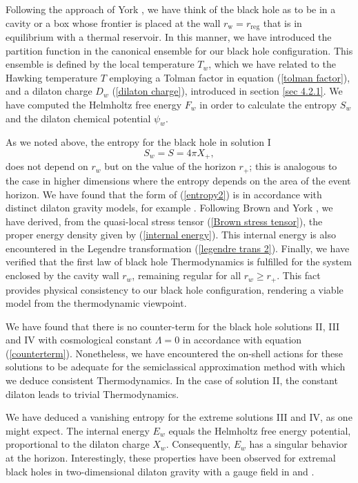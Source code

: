 \documentclass[sn-mathphys,Numbered]{sn-jnl}%
\theoremstyle{thmstyleone}%
\theoremstyle{thmstyletwo}%
\theoremstyle{thmstylethree}%
\begin{document}
Following the approach of York \cite{York2}, we have think of the black hole as to be in a cavity or a box whose frontier is placed at the wall $r_{\text{w}}=r_{\text{reg}}$ that is in equilibrium with a thermal reservoir. In this manner, we have introduced the partition function in the canonical ensemble for our black hole configuration. This ensemble is defined by the local temperature $T_w$, which we have related to the Hawking temperature $T$ employing a Tolman factor in equation (\ref{tolman factor}), and a dilaton charge $D_w$ (\ref{dilaton charge}), introduced in section \ref{sec 4.2.1}. We have computed the Helmholtz free energy $F_w$ in order to calculate the entropy $S_w$ and the dilaton chemical potential $\psi_w$. 

As we noted above, the entropy for the black hole in solution I
%
\begin{equation}\label{entropy2}
    S_w= S= 4\pi X_+,
\end{equation}
%
does not depend on $r_w$ but on the value of the horizon $r_+$; this is analogous to the case in higher dimensions where the entropy depends on the area of the event horizon. We have found that the form of (\ref{entropy2}) is in accordance with distinct dilaton gravity models, for example \cite{Grumiller,Davis,Nappi}. Following Brown and York \cite{Brown}, we have derived, from the quasi-local stress tensor (\ref{Brown stress tensor}), the proper energy density given by (\ref{internal energy}). This internal energy is also encountered in the Legendre transformation (\ref{legendre trans 2}). Finally, we have verified that the first law of black hole Thermodynamics is fulfilled for the system enclosed by the cavity wall $r_w$, remaining regular for all $r_w\geq r_+$. This fact provides physical consistency to our black hole configuration, rendering a viable model from the thermodynamic viewpoint. 

We have found that there is no counter-term for the black hole solutions II, III and IV with cosmological constant $\Lambda=0$ in accordance with equation (\ref{counterterm}). Nonetheless, we have encountered the on-shell actions for these solutions to be adequate for the semiclassical approximation method with which we deduce consistent Thermodynamics. In the case of solution II, the constant dilaton leads to trivial Thermodynamics.

We have deduced a vanishing entropy for the extreme solutions III and IV, as one might expect. The internal energy $E_w$ equals the Helmholtz free energy potential, proportional to the dilaton charge $X_w$. Consequently, $E_w$ has a singular behavior at the horizon. Interestingly, these properties have been observed for extremal black holes in two-dimensional dilaton gravity with a gauge field in \cite{Kumar} and \cite{Trivedi}.
\end{document}
